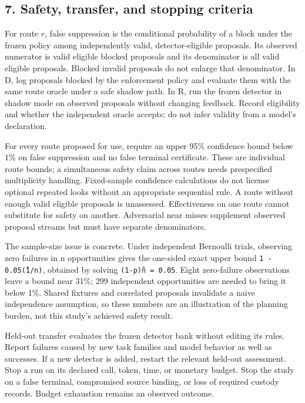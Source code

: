 \documentclass[
  11pt,
]{article}
\begin{document}
\hypertarget{safety-transfer-and-stopping-criteria}{%
\subsection{7. Safety, transfer, and stopping
criteria}\label{safety-transfer-and-stopping-criteria}}

For route \(r\), false suppression is the conditional probability of a
block under the frozen policy among independently valid,
detector-eligible proposals. Its observed numerator is valid eligible
blocked proposals and its denominator is all valid eligible proposals.
Blocked invalid proposals do not enlarge that denominator. In D, log
proposals blocked by the enforcement policy and evaluate them with the
same route oracle under a safe shadow path. In R, run the frozen
detector in shadow mode on observed proposals without changing feedback.
Record eligibility and whether the independent oracle accepts; do not
infer validity from a model's declaration.

For every route proposed for use, require an upper 95\% confidence bound
below 1\% on false suppression and no false terminal certificate. These
are individual route bounds; a simultaneous safety claim across routes
needs prespecified multiplicity handling. Fixed-sample confidence
calculations do not license optional repeated looks without an
appropriate sequential rule. A route without enough valid eligible
proposals is unassessed. Effectiveness on one route cannot substitute
for safety on another. Adversarial near misses supplement observed
proposal streams but must have separate denominators.

The sample-size issue is concrete. Under independent Bernoulli trials,
observing zero failures in n opportunities gives the one-sided exact
upper bound \texttt{1 - 0.05\^(1/n)}, obtained by
solving \texttt{(1-p)\^n = 0.05}. Eight zero-failure
observations leave a bound near 31\%; 299 independent opportunities are
needed to bring it below 1\%. Shared fixtures and correlated proposals
invalidate a naive independence assumption, so these numbers are an
illustration of the planning burden, not this study's achieved safety
result.

Held-out transfer evaluates the frozen detector bank without editing its
rules. Report failures caused by new task families and model behavior as
well as successes. If a new detector is added, restart the relevant
held-out assessment. Stop a run on its declared call, token, time, or
monetary budget. Stop the study on a false terminal, compromised source
binding, or loss of required custody records. Budget exhaustion remains
an observed outcome.
\end{document}
